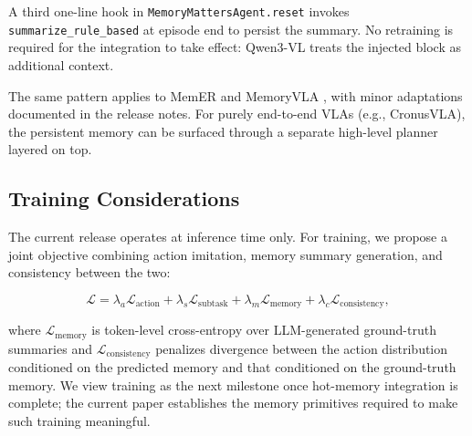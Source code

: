 A third one-line hook in \texttt{MemoryMattersAgent.reset} invokes
\texttt{summarize\_rule\_based} at episode end to persist the
summary. No retraining is required for the integration to take
effect: Qwen3-VL treats the injected block as additional context.

The same pattern applies to MemER \cite{memer} and MemoryVLA
\cite{memoryvla}, with minor adaptations documented in the
release notes. For purely end-to-end VLAs (e.g., CronusVLA), the
persistent memory can be surfaced through a separate high-level
planner layered on top.

\subsection{Training Considerations}
\label{sec:method:training}

The current release operates at inference time only. For training,
we propose a joint objective combining action imitation, memory
summary generation, and consistency between the two:

\begin{equation}
\mathcal{L} = \lambda_a \mathcal{L}_{\text{action}}
            + \lambda_s \mathcal{L}_{\text{subtask}}
            + \lambda_m \mathcal{L}_{\text{memory}}
            + \lambda_c \mathcal{L}_{\text{consistency}},
\label{eq:joint_loss}
\end{equation}

where $\mathcal{L}_{\text{memory}}$ is token-level cross-entropy over
LLM-generated ground-truth summaries and
$\mathcal{L}_{\text{consistency}}$ penalizes divergence between the
action distribution conditioned on the predicted memory and that
conditioned on the ground-truth memory. We view training as the
next milestone once hot-memory integration is complete; the current
paper establishes the memory primitives required to make such
training meaningful.
